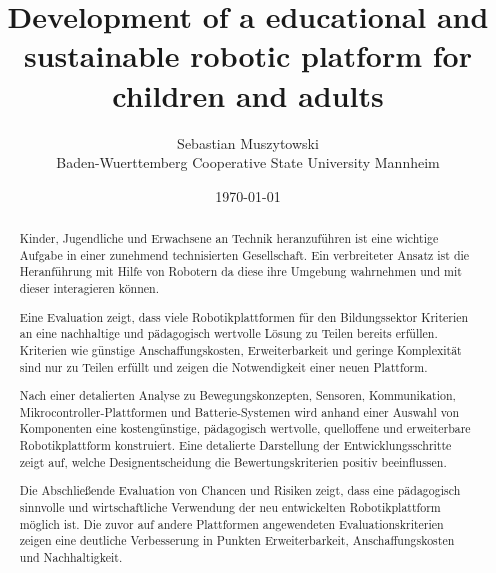 \documentclass[11pt,a4paper]{article}
\title{Development of a educational and sustainable robotic platform for children and adults}
\date{\today}
\author{Sebastian Muszytowski \\Baden-Wuerttemberg Cooperative State University Mannheim }
\begin{document}
\maketitle

\begin{abstract}
Kinder, Jugendliche und Erwachsene an Technik heranzuführen ist eine wichtige Aufgabe in einer zunehmend technisierten Gesellschaft. Ein verbreiteter Ansatz ist die Heranführung mit Hilfe von Robotern da diese ihre Umgebung wahrnehmen und mit dieser interagieren können. 

Eine Evaluation zeigt, dass viele Robotikplattformen für den Bildungssektor Kriterien an eine nachhaltige und pädagogisch wertvolle Lösung zu Teilen bereits erfüllen. Kriterien wie günstige Anschaffungskosten, Erweiterbarkeit und geringe Komplexität sind nur zu Teilen erfüllt und zeigen die Notwendigkeit einer neuen Plattform.

Nach einer detalierten Analyse zu Bewegungskonzepten, Sensoren, Kommunikation, Mikrocontroller-Plattformen und Batterie-Systemen wird anhand einer Auswahl von Komponenten eine kostengünstige, pädagogisch wertvolle, quelloffene und erweiterbare Robotikplattform konstruiert. Eine detalierte Darstellung der Entwicklungsschritte zeigt auf, welche Designentscheidung die Bewertungskriterien positiv beeinflussen.

Die Abschließende Evaluation von Chancen und Risiken zeigt, dass eine pädagogisch sinnvolle und wirtschaftliche Verwendung der neu entwickelten Robotikplattform möglich ist. Die zuvor auf andere Plattformen angewendeten Evaluationskriterien zeigen eine deutliche Verbesserung in Punkten Erweiterbarkeit, Anschaffungskosten und Nachhaltigkeit.
\end{abstract}
\end{document}
